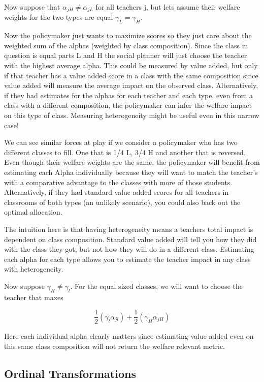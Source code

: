 \documentclass[letterpaper,12pt]{article}
\begin{document}
Now suppose that $\alpha_{jH} \neq \alpha_{jL}$ for all teachers j, but lets assume their welfare weights for the two types are equal $\gamma_L = \gamma_H$. 

Now the policymaker just wants to maximize scores so they just care about the weighted sum of the alphas (weighted by class composition). Since the class in question is equal parts L and H the social planner will just choose the teacher with the highest average alpha. This could be measured by value added, but only if that teacher has a value added score in a class with the same composition since value added will measure the average impact on the observed class. Alternatively, if they had estimates for the alphas for each teacher and each type, even from a class with a different composition, the policymaker can infer the welfare impact on this type of class. Measuring heterogeneity might be useful even in this narrow case! 

We can see similar forces at play if we consider a policymaker who has two different classes to fill. One that is 1/4 L, 3/4 H and another that is reversed. Even though their welfare weights are the same, the policymaker will benefit from estimating each Alpha individually because they will want to match the teacher's with a comparative advantage to the classes with more of those students. Alternatively, if they had standard value added scores for all teachers in classrooms of both types (an unlikely scenario), you could also back out the optimal allocation. 

The intuition here is that having heterogeneity means a teachers total impact is dependent on class composition. Standard value added will tell you how they did with the class they got, but not how they will do in a different class. Estimating each alpha for each type allows you to estimate the teacher impact in any class with heterogeneity. 

Now suppose $\gamma_H \neq \gamma_l $. For the equal sized classes, we will want to choose the teacher that maxes 

\begin{equation}
    \frac{1}{2}(\gamma_l \alpha_{jl}) +    \frac{1}{2}(\gamma_H \alpha_{jH})
\end{equation}

Here each individual alpha clearly matters since estimating value added even on this same class composition will not return the welfare relevant metric. 

\subsection{Ordinal Transformations}
\end{document}
